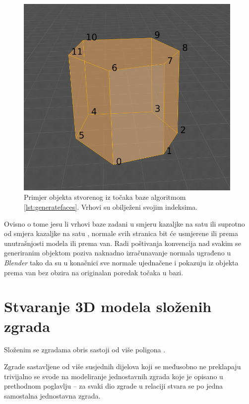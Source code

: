 \documentclass[times, utf8, zavrsni, numeric]{fer}
\begin{document}
		\begin{figure}[h]
			\includegraphics[width=11cm]{figures/mesh_generation.png}
			\centering
			\captionsetup{margin=2cm}
			\caption{Primjer objekta stvorenog iz točaka baze algoritmom \ref{lst:generatefaces}. Vrhovi su obilježeni svojim indeksima.}
			\label{fig:mesh_generation}
		\end{figure}
		
		Ovisno o tome jesu li vrhovi baze zadani u smjeru kazaljke na satu  ili suprotno od smjera kazaljke na satu , normale svih stranica bit će usmjerene ili prema unutrašnjosti modela ili prema van.
		Radi poštivanja konvencija nad svakim se generiranim objektom poziva naknadno  izračunavanje normala  ugrađeno u \textit{Blender} tako da su u konačnici sve normale ujednačene i pokazuju iz objekta prema van bez obzira na originalan poredak točaka u bazi.
	
	\eject
	
	
	\section{Stvaranje 3D modela složenih zgrada}
	
		Složenim se zgradama obris sastoji od više poligona .
		
		Zgrade sastavljene od više susjednih dijelova koji se međusobno ne preklapaju trivijalno se svode na modeliranje jednostavnih zgrada koje je opisano u prethodnom poglavlju -- za svaki dio zgrade  u relaciji stvara se po jedna samostalna jednostavna zgrada.
		
\end{document}
